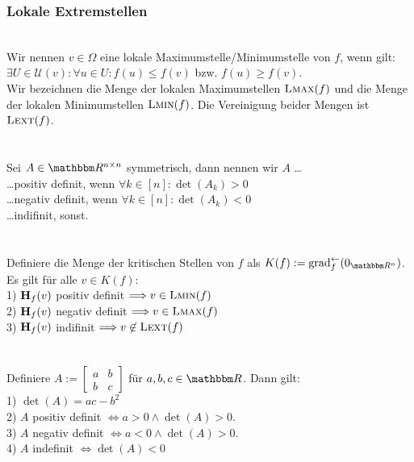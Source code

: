 \subsubsection*{Lokale Extremstellen}
 \\
Wir nennen \(v \in \Omega\) eine lokale Maximumstelle/Minimumstelle von \(f\), wenn gilt:\\
\(\exists U \in \mathcal U(v){:} \forall u \in U{:} f(u) \le f(v)\) bzw. \(f(u) \ge f(v)\). \\
Wir bezeichnen die Menge der lokalen Maximumstellen \(\text{\scshape Lmax}(f)\) und die Menge der lokalen Minimumstellen \(\text{\scshape Lmin}(f)\). Die Vereinigung beider Mengen ist \(\text{\scshape Lext}(f)\). \\ \\
 \\
Sei \(A\in\R^{n\times n}\) symmetrisch, dann nennen wir \(A\) \dots \\
\dots positiv definit, wenn \(\forall k \in [n]: \det(A_k) > 0\) \\
\dots negativ definit, wenn \(\forall k \in [n]: \det(A_k) < 0\) \\
\dots indifinit, sonst. \\ \\
 \\
Definiere die Menge der kritischen Stellen von \(f\) als \(K(f) := \grad_f^\leftarrow(0_{\R^n})\). \\
Es gilt für alle \(v \in K(f)\): \\
1) \(\textbf{H}_f(v)\) positiv definit \(\Longrightarrow v \in \text{\scshape Lmin}(f)\) \\
2) \(\textbf{H}_f(v)\) negativ definit \(\Longrightarrow v \in \text{\scshape Lmax}(f)\) \\
3) \(\textbf{H}_f(v)\) indifinit \(\Longrightarrow v \not\in \text{\scshape Lext}(f)\) \\ \\
 \\
Definiere \(A := \begin{bmatrix}
    a & b \\ b & c
\end{bmatrix}\) für \(a,b,c \in \R\). Dann gilt:\\
1) \(\det(A) = ac-b^2\) \\
2) \(A\) positiv definit \(\Longleftrightarrow a > 0 \wedge \det(A) > 0\). \\
3) \(A\) negativ definit \(\Longleftrightarrow a < 0 \wedge \det(A) > 0\). \\
4) \(A\) indefinit \(\Longleftrightarrow \det(A) < 0\)
